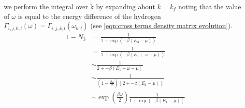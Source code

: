 we perform the integral over k by expanding about
\(k = k_f\) noting that the value of
\(\omega \) is equal to the energy
difference of the hydrogen
\(\Gamma_{i,j, k,l}(\omega) = \Gamma_{i,j, k,l}(\omega_{k,l})\)
(see \cref{eqn:cross terms density matrix evolution}).
\begin{align}
    1 - N_3 & = \frac{1}{1 + \exp{(-\beta(E_3 - \mu))}}                                  \\
            & = \frac{1}{1 + \exp{(-\beta(E_1 + \omega - \mu))}}                         \\
            & \sim \frac{1}{2 + -\beta(E_1 + \omega - \mu)}                              \\
            & \sim \frac{1}{(1 - \frac{\beta \omega}{2})(2 + -\beta(E_1  - \mu))}        \\
            & \sim \exp{(\frac{\beta \omega}{2})}\frac{1}{1 + \exp{(-\beta(E_1 - \mu))}}
\end{align}

